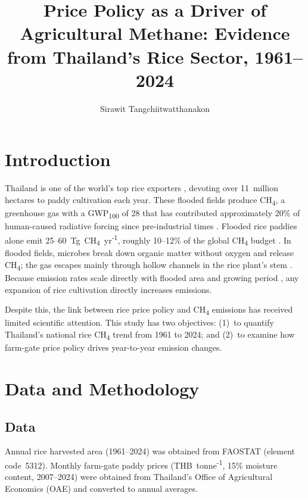 \documentclass[fleqn,10pt]{olplainarticle}
\title{Price Policy as a Driver of Agricultural Methane: Evidence from
       Thailand's Rice Sector, 1961--2024}
\author[1]{Sirawit Tangchiitwatthanakon}
\affil[1]{The Hong Kong University of Science and Technology (Guangzhou), Guangzhou, China}
\begin{document}
\onehalfspacing
\flushbottom
\maketitle
\thispagestyle{empty}

\section*{Introduction}

Thailand is one of the world's top rice exporters \citep{faostat2026},
devoting over 11~million hectares to paddy cultivation each year.
These flooded fields produce CH\textsubscript{4}, a greenhouse gas with a
GWP\textsubscript{100} of 28 that has contributed approximately 20\% of
human-caused radiative forcing since pre-industrial times \citep{myhre2013}.
Flooded rice paddies alone emit 25--60~Tg~CH\textsubscript{4}~yr\textsuperscript{-1},
roughly 10--12\% of the global CH\textsubscript{4} budget
\citep{neue1993, yan2009}.
In flooded fields, microbes break down organic matter without oxygen and release
CH\textsubscript{4}; the gas escapes mainly through hollow channels in the rice
plant's stem \citep{neue1993}.
Because emission rates scale directly with flooded area and growing period
\citep{ipcc2006}, any expansion of rice cultivation directly increases emissions.

Despite this, the link between rice price policy and CH\textsubscript{4}
emissions has received limited scientific attention.
This study has two objectives: (1)~to quantify Thailand's national rice
CH\textsubscript{4} trend from 1961 to 2024; and (2)~to examine how farm-gate
price policy drives year-to-year emission changes.

\section*{Data and Methodology}

\subsection*{Data}

Annual rice harvested area (1961--2024) was obtained from FAOSTAT
\citep{faostat2026} (element code~5312).
Monthly farm-gate paddy prices (THB~tonne\textsuperscript{-1}, 15\% moisture
content, 2007--2024) were obtained from Thailand's Office of Agricultural
Economics (OAE) \citep{oae2024} and converted to annual averages.
\end{document}
